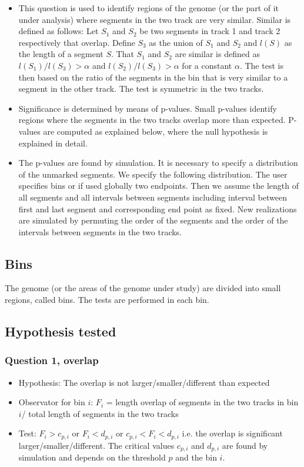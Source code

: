 \documentclass{article}
\begin{document}
\begin{itemize}
	\item This question is used to identify regions of the genome (or the part of it under analysis) where 
segments in the two track are very similar. Similar is defined as follows: Let $S_1$ and $S_2$ be two segments in 
track 1 and track 2 respectively that overlap. Define $S_3$ as the union of $S_1$ and $S_2$ and $l(S)$ as
 the length of a segment $S$. That $S_1$ and $S_2$ are similar is defined as $l(S_1)/l(S_3)>\alpha$ and
 $l(S_2)/l(S_3)>\alpha$
for a constant $\alpha$. The test is then based on the ratio of the segments in the bin that is very similar to a segment 
in the other track.    The test is symmetric in the two tracks. 
	\item Significance is determined by means of p-values. Small p-values identify regions where the segments
in the two tracks overlap more than expected.  P-values are computed as explained below, where the null hypothesis is explained in detail.
	\item The p-values are found by simulation. It is necessary to specify a distribution of the unmarked 
segments. We specify the following distribution. The user specifies bins or if used globally two endpoints. Then we 
assume the length of all segments and all intervals between segments including interval between first and last
segment and corresponding end point as fixed. New realizations are simulated by permuting the order of the 
segments and the order of the intervals between segments in the two tracks.   
\end{itemize}



\subsection {Bins}

The genome (or the areas of the genome under study) are divided into small regions, called bins. The tests are 
performed in each bin.  

\subsection {Hypothesis tested}

\subsubsection {Question 1, overlap}

\begin{itemize}
\item Hypothesis: The overlap is not larger/smaller/different than expected 
	\item Observator for bin $i$: 
$  F_i$ =   length overlap of segments in the two tracks in bin $i$/ 
               total length of segments in the two tracks 
\item Test: $F_i > c_{p,i}$ or  $F_i < d_{p,i}$ or  $  c_{p,i}<F_i < d_{p,i}$  i.e. the overlap 
is significant larger/smaller/different.  The critical values   $  c_{p,i}$ and $ d_{p,i}$ are
 found by simulation and depends on the threshold $p$ and the bin  $i.$  
\end{itemize}
\end{document}
